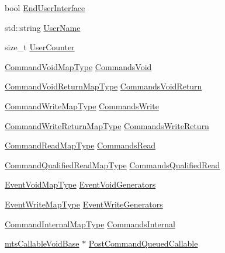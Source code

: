 \begin{DoxyCompactItemize}
\item 
bool \hyperlink{classmts_interface_provided_a928ec16cac3e49dfbddb294032fd3ab3}{End\+User\+Interface}
\item 
std\+::string \hyperlink{classmts_interface_provided_a37bb4e89240cb1056a013d9aa9b1d2aa}{User\+Name}
\item 
size\+\_\+t \hyperlink{classmts_interface_provided_a6a475bd79ec48c9db26b25c7d4e0a40f}{User\+Counter}
\item 
\hyperlink{classmts_interface_provided_af8414fb168541e531244967e0cc1afd2}{Command\+Void\+Map\+Type} \hyperlink{classmts_interface_provided_af1685c84fa379fffebf06605e1008251}{Commands\+Void}
\item 
\hyperlink{classmts_interface_provided_a963eeb4ba8e38411de4d40f983d5b4b3}{Command\+Void\+Return\+Map\+Type} \hyperlink{classmts_interface_provided_a650fc2d4d2b1350deeed706e6c2cd2de}{Commands\+Void\+Return}
\item 
\hyperlink{classmts_interface_provided_ad6809b9c0d16a2eb490429e6adace990}{Command\+Write\+Map\+Type} \hyperlink{classmts_interface_provided_a02f4ee724a9f03a524bfede2dd903a8e}{Commands\+Write}
\item 
\hyperlink{classmts_interface_provided_aaf1b5a70c029bb3c3bc2280ae1513c01}{Command\+Write\+Return\+Map\+Type} \hyperlink{classmts_interface_provided_af9df90920897bc835cfd86618023f025}{Commands\+Write\+Return}
\item 
\hyperlink{classmts_interface_provided_ab6a636c8cfda921a078ae1df8d90e087}{Command\+Read\+Map\+Type} \hyperlink{classmts_interface_provided_a91c9d2f72628533c2c6f88dcbcc8945c}{Commands\+Read}
\item 
\hyperlink{classmts_interface_provided_a08e212add6d96324bf5e029d09349a04}{Command\+Qualified\+Read\+Map\+Type} \hyperlink{classmts_interface_provided_ae67e71a6973cd2a190508e613e9cdb0c}{Commands\+Qualified\+Read}
\item 
\hyperlink{classmts_interface_provided_a81dc5f40eef8155cfc0ddad74c5c1b6a}{Event\+Void\+Map\+Type} \hyperlink{classmts_interface_provided_aebc0386db6c9bca51fc1c5e09dd6dfaf}{Event\+Void\+Generators}
\item 
\hyperlink{classmts_interface_provided_a98f1388a3c2119a1ae97f19302eeb550}{Event\+Write\+Map\+Type} \hyperlink{classmts_interface_provided_af12999317bfed03aa5b8a339f5624c97}{Event\+Write\+Generators}
\item 
\hyperlink{classmts_interface_provided_afbea756c205cd50db2a0884681ad650a}{Command\+Internal\+Map\+Type} \hyperlink{classmts_interface_provided_ad0aa42200e6d536f38ac743ae0a45767}{Commands\+Internal}
\item 
\hyperlink{classmts_callable_void_base}{mts\+Callable\+Void\+Base} $\ast$ \hyperlink{classmts_interface_provided_af7e4e42c17eea4b0a71fa7650a34a120}{Post\+Command\+Queued\+Callable}
\end{DoxyCompactItemize}
